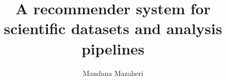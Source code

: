 \author{Mandana Mazaheri}
\title{A recommender system for scientific datasets and analysis pipelines}


